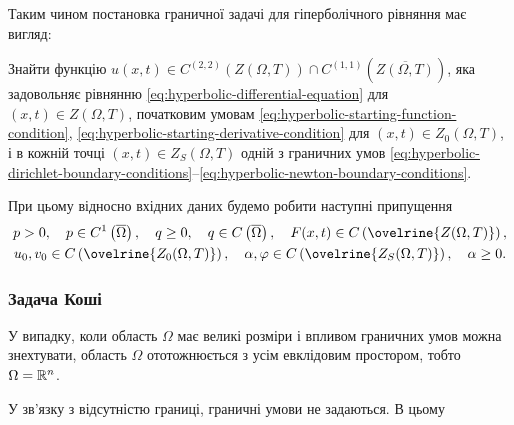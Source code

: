 Таким чином постановка граничної задачі для гіперболічного рівняння має вигляд: \medskip

Знайти функцію $u(x, t) \in C^{(2, 2)} (Z(\Omega, T)) \cap C^{(1, 1)} \left( \overline {Z(\Omega, T)} \right)$, яка задовольняє рівнянню \eqref{eq:hyperbolic-differential-equation} для $(x, t) \in Z(\Omega, T)$, початковим умовам \eqref{eq:hyperbolic-starting-function-condition}, \eqref{eq:hyperbolic-starting-derivative-condition} для $(x, t) \in Z_0(\Omega, T)$, і в кожній точці $(x, t) \in Z_S(\Omega, T)$ одній з граничних умов \eqref{eq:hyperbolic-dirichlet-boundary-conditions}--\eqref{eq:hyperbolic-newton-boundary-conditions}. \medskip

При цьому відносно вхідних даних будемо робити наступні припущення
\begin{gather}
    p > 0, \quad p \in C^1 \left( \overline \Omega \right), \quad q \ge 0, \quad q \in C \left( \overline \Omega \right), \quad F(x, t) \in C \left( \ovelrine{Z(\Omega, T)} \right), \\
    u_0, v_0 \in C \left( \ovelrine{Z_0(\Omega, T)} \right), \quad \alpha, \phi \in C \left( \ovelrine{Z_S(\Omega, T)} \right), \quad \alpha \ge 0.
\end{gather}

\subsubsection{Задача Коші}

У випадку, коли область $\Omega$ має великі розміри і впливом граничних умов можна знехтувати, область $\Omega$ ототожнюється з усім евклідовим простором, тобто $\Omega = \mathbb{R}^n$. \medskip

У зв'язку з відсутністю границі, граничні умови не задаються. В цьому

\newpage 

